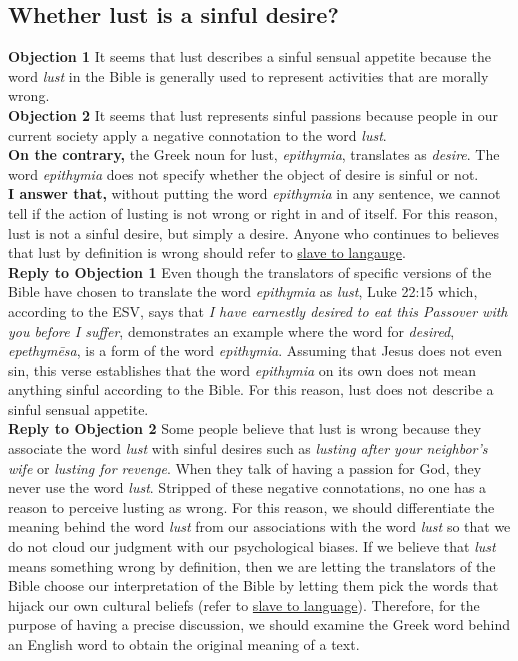 \documentclass[a4paper, parskip=full, 12pt]{article}
\begin{document}
\subsection{Whether lust is a sinful desire?}
\textbf{Objection 1} It seems that lust describes a sinful sensual appetite because the word \textit{lust} in the Bible is generally used to represent activities that are morally wrong. \\
\textbf{Objection 2} It seems that lust represents sinful passions because people in our current society apply a negative connotation to the word \textit{lust}. \\
\textbf{On the contrary,} the Greek noun for lust, \textit{epithymia}, translates as \textit{desire}. The word \textit{epithymia} does not specify whether the object of desire is sinful or not. \\
\textbf{I answer that,} without putting the word \textit{epithymia} in any sentence, we cannot tell if the action of lusting is not wrong or right in and of itself. For this reason, lust is not a sinful desire, but simply a desire. Anyone who continues to believes that lust by definition is wrong should refer to \underline{slave to langauge}. \\
\textbf{Reply to Objection 1} Even though the translators of specific versions of the Bible have chosen to translate the word \textit{epithymia} as \textit{lust}, Luke 22:15 which, according to the ESV, says that \textit{I have earnestly desired to eat this Passover with you before I suffer}, demonstrates an example where the word for \textit{desired}, \textit{epethymēsa}, is a form of the word \textit{epithymia}. Assuming that Jesus does not even sin, this verse establishes that the word \textit{epithymia} on its own does not mean anything sinful according to the Bible. For this reason, lust does not describe a sinful sensual appetite. \\
\textbf{Reply to Objection 2} Some people believe that lust is wrong because they associate the word \textit{lust} with sinful desires such as \textit{lusting after your neighbor's wife} or \textit{lusting for revenge}. When they talk of having a passion for God, they never use the word \textit{lust}. Stripped of these negative connotations, no one has a reason to perceive lusting as wrong. For this reason, we should differentiate the meaning behind the word \textit{lust} from our associations with the word \textit{lust} so that we do not cloud our judgment with our psychological biases. If we believe that \textit{lust} means something wrong by definition, then we are letting the translators of the Bible choose our interpretation of the Bible by letting them pick the words that hijack our own cultural beliefs (refer to \underline{slave to language}). Therefore, for the purpose of having a precise discussion, we should examine the Greek word behind an English word to obtain the original meaning of a text. \\
\end{document}

